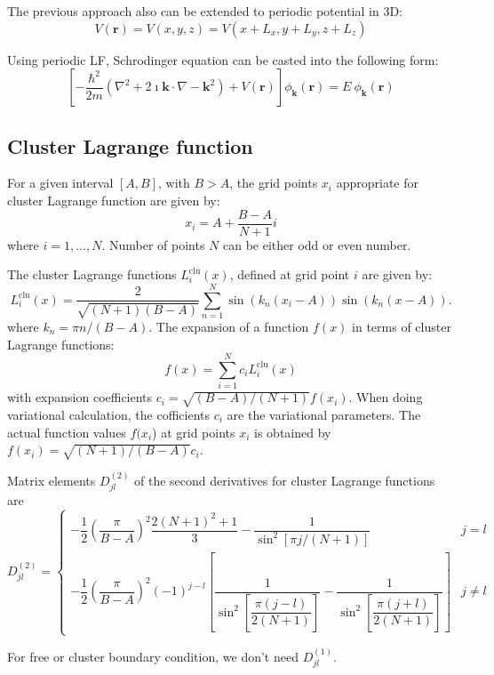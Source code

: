 The previous approach also can be extended to periodic potential in 3D:
\[
V(\mathbf{r})=V(x,y,z)=V\left(x+L_{x},y+L_{y},z+L_{z}\right)
\]

Using periodic LF, Schrodinger equation can be casted into the following form:
\begin{equation}
\left[-\dfrac{\hbar^{2}}{2m}\left(\nabla^{2}+2\imath\mathbf{k}\cdot\nabla-\mathbf{k}^{2}\right)+V(\mathbf{r})\right]\phi_{\mathbf{k}}(\mathbf{r})=E\ \phi_{\mathbf{k}}(\mathbf{r})
\end{equation}


\subsection{Cluster Lagrange function}

For a given interval $[A,B]$, with $B>A$, the grid points $x_{i}$
appropriate for cluster Lagrange function are given by:
\[
x_{i}=A+\frac{B-A}{N+1}i
\]
where $i=1,\ldots,N$. Number of points $N$ can be either odd or
even number.

The cluster Lagrange functions $L_{i}^{\mathrm{clu}}(x)$, defined
at grid point $i$ are given by:
\begin{equation}
L_{i}^{\mathrm{clu}}(x)=\frac{2}{\sqrt{(N+1)(B-A)}}\sum_{n=1}^{N}\sin\left(k_{n}(x_{i}-A)\right)\sin\left(k_{n}(x-A)\right).
\end{equation}
where $k_{n}=\pi n/(B-A)$. The expansion of a function $f(x)$ in
terms of cluster Lagrange functions:
\begin{equation}
f(x)=\sum_{i=1}^{N}c_{i}L_{i}^{\mathrm{clu}}(x)
\end{equation}
with expansion coefficients $c_{i}=\sqrt{(B-A)/(N+1)}f(x_{i})$. When
doing variational calculation, the cofficients $c_{i}$ are the variational
parameters. The actual function values $f(x_{i}$) at grid points
$x_{i}$ is obtained by $f(x_{i})=\sqrt{(N+1)/(B-A)}c_{i}$.

Matrix elements $D_{jl}^{(2)}$ of the second derivatives for cluster
Lagrange functions are
\begin{equation}
D_{jl}^{(2)}=\begin{cases}
-\dfrac{1}{2}\left(\dfrac{\pi}{B-A}\right)^{2}\dfrac{2(N+1)^{2}+1}{3}-\dfrac{1}{\sin^{2}\left[\pi j/(N+1)\right]} & j=l\\
-\dfrac{1}{2}\left(\dfrac{\pi}{B-A}\right)^{2}(-1)^{j-l}\left[\dfrac{1}{\sin^{2}\left[\dfrac{\pi(j-l)}{2(N+1)}\right]}-\dfrac{1}{\sin^{2}\left[\dfrac{\pi(j+l)}{2(N+1)}\right]}\right] & j\neq l
\end{cases}
\end{equation}

For free or cluster boundary condition, we don't need $D_{jl}^{(1)}$.
